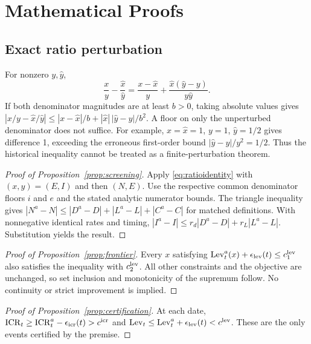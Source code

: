 \documentclass[11pt,a4paper]{article}
\newcommand{\ICR}{\mathrm{ICR}}
\newcommand{\Lev}{\mathrm{Lev}}
\theoremstyle{plain}
\theoremstyle{definition}
\begin{document}
\newpage\appendix
\section{Mathematical Proofs}\label{app:proofs}
\subsection{Exact ratio perturbation}
For nonzero $y,\widehat y$,
\begin{equation}
\frac{x}{y}-\frac{\widehat x}{\widehat y}
=\frac{x-\widehat x}{y}
 +\frac{\widehat x(\widehat y-y)}{y\widehat y}.
\label{eq:ratioidentity}
\end{equation}
If both denominator magnitudes are at least $b>0$, taking absolute values gives
$|x/y-\widehat x/\widehat y|\le|x-\widehat x|/b+
|\widehat x|\,|\widehat y-y|/b^2$. A floor on only the unperturbed denominator
does not suffice. For example, $x=\widehat x=1$, $y=1$,
$\widehat y=1/2$ gives difference 1, exceeding the erroneous first-order bound
$|\widehat y-y|/y^2=1/2$. Thus the historical inequality cannot be treated as a
finite-perturbation theorem.

\begin{proof}[Proof of Proposition~\ref{prop:screening}]
Apply \eqref{eq:ratioidentity} with $(x,y)=(E,I)$ and then $(N,E)$.
Use the respective common denominator floors $i$ and $e$ and the stated analytic
numerator bounds. The triangle inequality gives
$|N^a-N|\le|D^a-D|+|L^a-L|+|C^a-C|$ for matched definitions.
With nonnegative identical rates and timing,
$|I^a-I|\le r_d|D^a-D|+r_L|L^a-L|$. Substitution yields the result.
\end{proof}
\begin{proof}[Proof of Proposition~\ref{prop:frontier}]
Every $x$ satisfying $\Lev_t^a(x)+\epsilon_{\rm lev}(t)\le c_1^{\rm lev}$
also satisfies the inequality with $c_2^{\rm lev}$. All other constraints and the
objective are unchanged, so set inclusion and monotonicity of the supremum follow.
No continuity or strict improvement is implied.
\end{proof}
\begin{proof}[Proof of Proposition~\ref{prop:certification}]
At each date, $\ICR_t\ge\ICR_t^a-\epsilon_{\rm icr}(t)>c^{\rm icr}$
and $\Lev_t\le\Lev_t^a+\epsilon_{\rm lev}(t)<c^{\rm lev}$.
These are the only events certified by the premise.
\end{proof}
\end{document}
